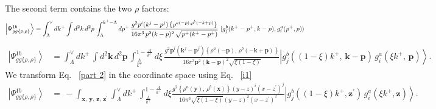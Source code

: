 \documentclass[aps,prd,amsmath,amssymb,nofootinbib]{revtex4-2}
\numberwithin{equation}{section}
\begin{document}
The second term contains the two $\rho$ factors:
\begin{align}
    \left|\Psi_{gg\{\rho,\rho\}}^{1b}\right\rangle & =  \int_{\Lambda}^{\vee} dk^{+} \int d^{2}k\, d^{2}p\, \int_{\Lambda}^{k^{+}-\Lambda}dp^{+}\, \frac{g^{2}p^{i}(k^{j}-p^{j})\,\{\rho^{a(-p),\rho^{b}(-k+p)}\}}{16\pi^{3}\,p^{2}(k-p)^{2}\, \sqrt{p^{+}(k^{+}-p^{+})}}\, \ket{g^{b}_{j}(k^{+}-p^{+}, k-p),g^{a}_{i}(p^{+},p)}
\end{align}
\begin{align}\label{part 2}
\left|\Psi_{gg\{\rho,\rho\}}^{1b}\right\rangle &= \int_{\Lambda}^{\vee}dk^{+}\,\int d^{2}\mathbf{k}\, d^{2}\mathbf{p}\,\int_{\frac{\Lambda}{k^{+}}}^{1-\frac{\Lambda}{k^{+}}}d\xi\,\frac{g^{2}\mathbf{p}^{i}\left(\mathbf{k}^{j}-\mathbf{p}^{j}\right)\left\{ \rho^{a}(-\mathbf{p}),\,\rho^{b}(-\mathbf{k}+\mathbf{p})\right\} }{16\pi^{3}\mathbf{p}^{2}(\mathbf{k}-\mathbf{p})^{2}\sqrt{\xi(1-\xi)}}  \left|g_{j}^{b}((1-\xi)k^{+},\,\mathbf{k}-\mathbf{p})\,g_{i}^{a}(\xi k^{+},\,\mathbf{p})\right\rangle.
\end{align}
We transform Eq.~ \eqref{part 2} in the coordinate space using Eq.~ \eqref{i1}
\begin{align}\label{gg_rhorho}
\left|\Psi_{gg\{\rho,\rho\}}^{1b}\right\rangle &=\,-\int_{\mathbf{x},\,\mathbf{y},\,\mathbf{z},\,\mathbf{z}^{\prime}}\int_{\Lambda}^{\vee}dk^{+}\,\int_{\frac{\Lambda}{k^{+}}}^{1-\frac{\Lambda}{k^{+}}}d\xi\frac{g^{2}\left\{ \rho^{a}(\mathbf{y}),\,\rho^{b}(\mathbf{x})\right\} (y-z)^{i}(x-z^{\prime})^{j}}{16\pi^{3}\sqrt{\xi(1-\xi)}(y-z)^{2}(x-z^{\prime})^{2}}\left|g_{j}^{b}((1-\xi)k^{+},\mathbf{z}^{\prime})\, g_{i}^{a}(\xi k^{+},\mathbf{z})\right\rangle .
\end{align}
\end{document}
